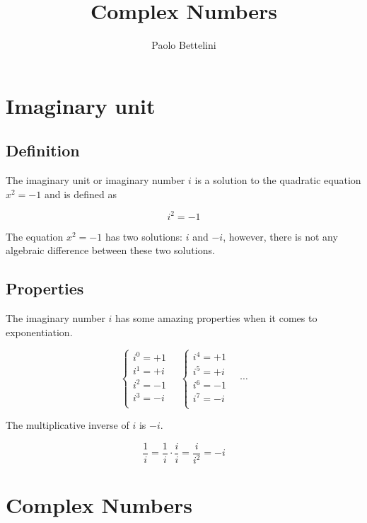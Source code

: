 \documentclass[a4paper]{article}
\title{Complex Numbers}
\author{Paolo Bettelini}
\date{}
\begin{document}
\maketitle
\tableofcontents
\pagebreak

\section{Imaginary unit}

\subsection{Definition}

The imaginary unit or imaginary number \(i\) is a solution to the quadratic
equation \(x^2=-1\) and is defined as

\[
    i^2 = -1
\]

The equation \(x^2 = -1\) has two solutions: \(i\) and \(-i\), however,
there is not any algebraic difference between these two solutions.

\subsection{Properties}

The imaginary number \(i\) has some amazing properties when it comes to exponentiation.

\[
	\begin{cases}
		i^0=+1\\
		i^1=+i\\
		i^2=-1\\
		i^3=-i\\
	\end{cases}
	\quad
	\begin{cases}
		i^4=+1\\
		i^5=+i\\
		i^6=-1\\
		i^7=-i\\
	\end{cases}
	\quad
	\cdots
\]

The multiplicative inverse of \(i\) is \(-i\).

\[
    \frac{1}{i} = \frac{1}{i} \cdot \frac{i}{i}
    = \frac{i}{i^2} = -i
\]

\pagebreak

\section{Complex Numbers}
\end{document}
